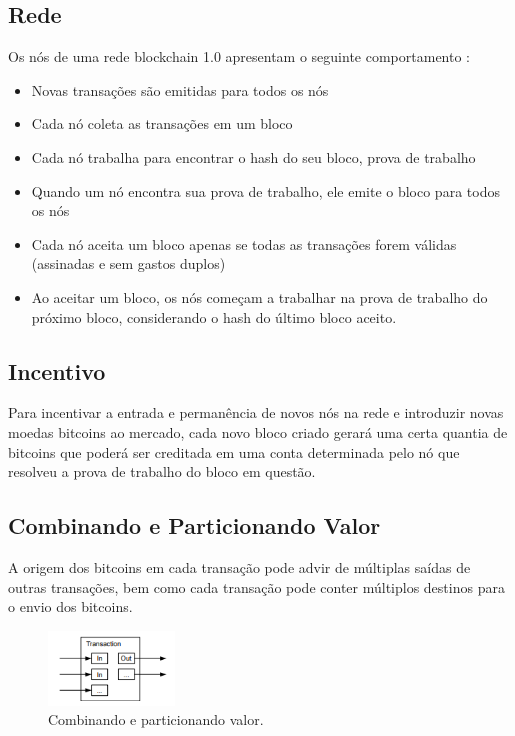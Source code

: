 \subsection{Rede}

Os nós de uma rede blockchain 1.0 apresentam o seguinte comportamento \cite{paper_satoshi}:

\begin{itemize}
\item Novas transações são emitidas para todos os nós
\item Cada nó coleta as transações em um bloco
\item Cada nó trabalha para encontrar o hash do seu bloco, prova de trabalho
\item Quando um nó encontra sua prova de trabalho, ele emite o bloco para todos os nós
\item Cada nó aceita um bloco apenas se todas as transações forem válidas (assinadas e sem gastos duplos)
\item Ao aceitar um bloco, os nós começam a trabalhar na prova de trabalho do próximo bloco, considerando o hash do último bloco aceito.

\end{itemize}

\subsection{Incentivo}

Para incentivar a entrada e permanência de novos nós na rede e introduzir novas moedas bitcoins ao mercado, cada novo bloco criado gerará uma certa quantia de bitcoins que poderá ser creditada em uma conta determinada pelo nó que resolveu a prova de trabalho do bloco em questão.

\subsection{Combinando e Particionando Valor}

A origem dos bitcoins em cada transação pode advir de múltiplas saídas de outras transações, bem como cada transação pode conter múltiplos destinos para o envio dos bitcoins.

\begin{figure}[ht]
\centering
\includegraphics[width=0.3\textwidth]{Cap1/value_partition}
\caption{Combinando e particionando valor.}
\label{value_partition}
\end{figure}

